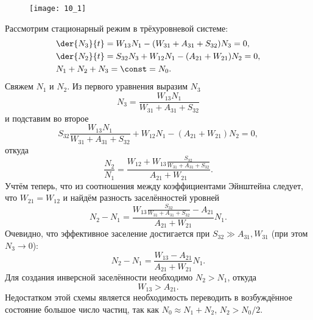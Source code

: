 
\begin{figure}[h]
\begin{center}
    \texttt{[image: 10\_1]}
\end{center}
\end{figure}

Рассмотрим стационарный режим в трёхуровневой системе:
\begin{align*}
    & \der{N_3}{t} = W_{13}N_1 - (W_{31} + A_{31} + S_{32}) N_3 = 0,\\
    & \der{N_2}{t} = S_{32}N_3 + W_{12}N_1 - (A_{21} + W_{21}) N_2 = 0,\\
    & N_1 + N_2 + N_3 = \const = N_0.
\end{align*}
Свяжем \( N_1 \) и \( N_2 \). Из первого уравнения выразим \( N_3 \)
\[
    N_3 = \frac{W_{13}N_1}{W_{31} + A_{31} + S_{32}}
\]
и подставим во второе
\[
    S_{32}\frac{W_{13}N_1}{W_{31} + A_{31} + S_{32}} + W_{12}N_1 -
    (A_{21} + W_{21}) N_2 = 0,
\]
откуда
\[
    \frac{N_2}{N_1} =
        \frac{W_{12} + W_{13}\frac{S_{32}}{W_{31} + A_{31} + S_{32}}}
        {A_{21} + W_{21}}.
\]
Учтём теперь, что из соотношения между коэффициентами Эйнштейна следует, что
\( W_{21} = W_{12} \) и найдём разность заселённостей уровней
\[
    N_2 - N_1 =
        \frac{W_{13}\frac{S_{32}}{W_{31} + A_{31} + S_{32}} - A_{21}}
        {A_{21} + W_{21}}N_1.
\]
Очевидно, что эффективное заселение достигается при
\( S_{32} \gg A_{31}, W_{31} \) (при этом \( N_3 \to 0 \)):
\[
    N_2 - N_1 =
        \frac{W_{13} - A_{21}}{A_{21} + W_{21}}N_1.
\]
Для создания инверсной заселённости необходимо \( N_2 > N_1 \), откуда
\[
    W_{13} > A_{21}.
\]
Недостатком этой схемы является необходимость переводить в возбуждённое
состояние большое число частиц, так как \( N_0 \approx N_1 + N_2 \),
\( N_2 > N_0/2 \).


